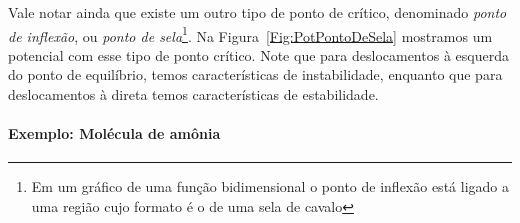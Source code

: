Vale notar ainda que existe um outro tipo de ponto de crítico, denominado \emph{ponto de inflexão}, ou \emph{ponto de sela}\footnote{Em um gráfico de uma função bidimensional o ponto de inflexão está ligado a uma região cujo formato é o de uma sela de cavalo}. Na Figura~\ref{Fig:PotPontoDeSela} mostramos um potencial com esse tipo de ponto crítico. Note que para deslocamentos à esquerda do ponto de equilíbrio, temos características de instabilidade, enquanto que para deslocamentos à direta temos características de estabilidade.

\paragraph{Exemplo: Molécula de amônia}

